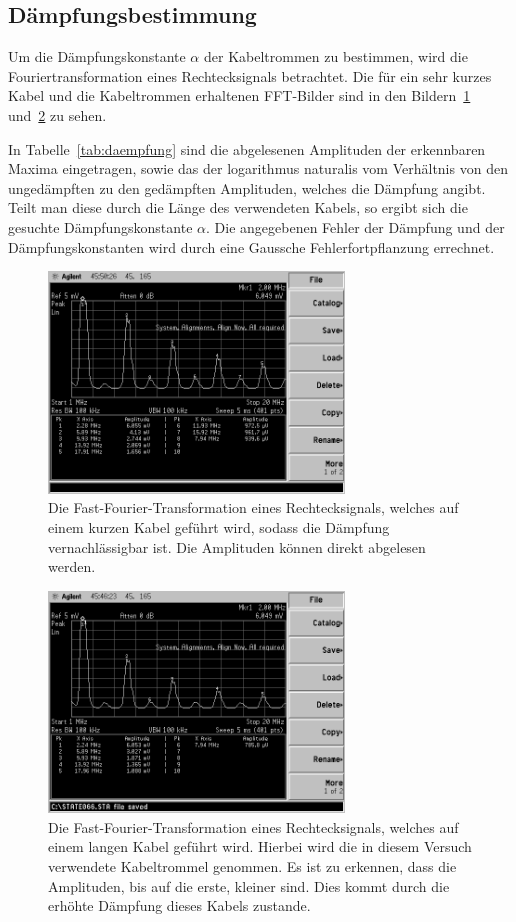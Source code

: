 \subsection{Dämpfungsbestimmung}
%
Um die Dämpfungskonstante $\alpha$ der Kabeltrommen zu bestimmen, wird
die Fouriertransformation eines Rechtecksignals betrachtet. Die für ein
sehr kurzes Kabel und die Kabeltrommen erhaltenen FFT-Bilder sind in den
Bildern~\ref{fig:daempfung_kurz} und~\ref{fig:daempfung_lang} zu sehen.

In Tabelle~\ref{tab:daempfung} sind die abgelesenen Amplituden der
erkennbaren Maxima eingetragen, sowie das der logarithmus naturalis 
vom Verhältnis von den
ungedämpften zu den gedämpften Amplituden, welches die Dämpfung
angibt. Teilt man diese durch die Länge des verwendeten Kabels, so
ergibt sich die gesuchte Dämpfungskonstante $\alpha$.
Die angegebenen Fehler der Dämpfung und der Dämpfungskonstanten 
wird durch eine Gaussche Fehlerfortpflanzung errechnet.
%
\begin{figure}[]
  \centering
  \includegraphics[width=0.7\textwidth]{daempfung_kurz.png}
  \caption{Die Fast-Fourier-Transformation eines Rechtecksignals,
    welches auf einem kurzen Kabel geführt wird, sodass die Dämpfung
    vernachlässigbar ist. Die Amplituden können direkt abgelesen
    werden.}
  \label{fig:daempfung_kurz}
\end{figure}
%
\begin{figure}[]
  \centering
  \includegraphics[width=0.7\textwidth]{daempfung_lang.png}
  \caption{Die Fast-Fourier-Transformation eines Rechtecksignals,
    welches auf einem langen Kabel geführt wird. Hierbei wird die in
    diesem Versuch verwendete Kabeltrommel genommen.  Es ist zu
    erkennen, dass die Amplituden, bis auf die erste, kleiner sind. Dies
    kommt durch die erhöhte Dämpfung dieses Kabels zustande.}
  \label{fig:daempfung_lang}
\end{figure}

